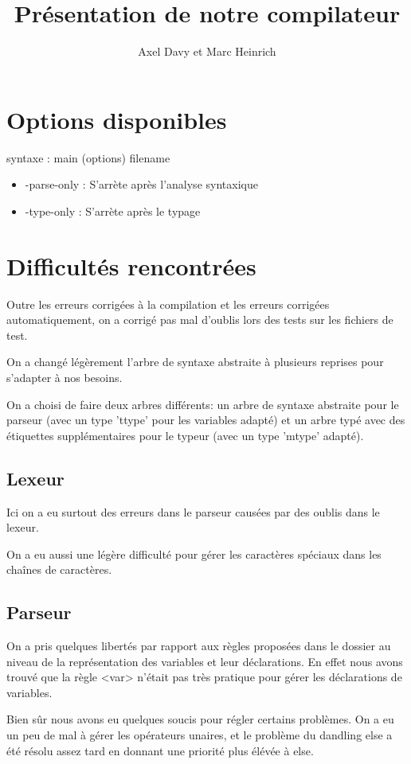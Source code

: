 \documentclass[a4paper]{article}
\author{Axel Davy et Marc Heinrich}
\title{Présentation de notre compilateur}
\begin{document}
\maketitle

\section{Options disponibles}
syntaxe : main (options) filename
\begin{itemize}
     \item {-parse-only : S'arrète après l'analyse syntaxique }
     \item {-type-only : S'arrète après le typage }
\end{itemize}
\section{Difficultés rencontrées}
Outre les erreurs corrigées à la compilation et les erreurs corrigées
automatiquement, on a corrigé pas mal d'oublis lors des tests sur les
fichiers de test.

On a changé légèrement l'arbre de syntaxe abstraite à plusieurs reprises
pour s'adapter à nos besoins.

On a choisi de faire deux arbres différents: un arbre de syntaxe abstraite
pour le parseur (avec un type 'ttype' pour les variables adapté) et un arbre typé avec des
étiquettes supplémentaires pour le typeur (avec un type 'mtype' adapté).

\subsection{Lexeur}
Ici on a eu surtout des erreurs dans le parseur causées par des oublis dans
le lexeur.

On a eu aussi une légère difficulté pour gérer les caractères spéciaux dans
les chaînes de caractères.

\subsection{Parseur}

On a pris quelques libertés par rapport aux règles proposées dans le
dossier au niveau de la représentation des variables et leur
déclarations. En effet nous avons trouvé que la règle <var> n'était pas très pratique pour gérer
les déclarations de variables.

Bien sûr nous avons eu quelques soucis pour régler certains problèmes. On a
eu un peu de mal à gérer les opérateurs unaires, et le
problème du dandling else a été résolu assez tard en donnant une priorité
plus élévée à else. 
\end{document}

